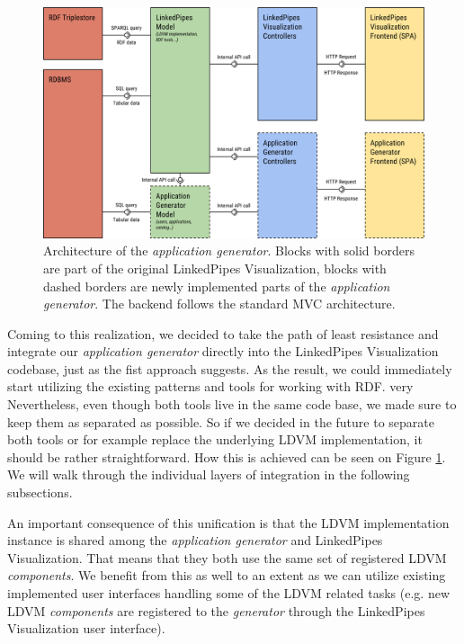 \begin{figure}
	\centering
	\includegraphics[width=140mm]{img/04_application_generator_architecture.png}
	\caption{Architecture of the \emph{application generator}. Blocks with solid borders are part of the original LinkedPipes Visualization, blocks with dashed borders are newly implemented parts of the \emph{application generator}. The backend follows the standard MVC architecture.} 
	\label{fig:proposed-application-generator-architecture}
\end{figure}

Coming to this realization, we decided to take the path of least resistance and integrate our \emph{application generator} directly into the LinkedPipes Visualization codebase, just as the fist approach suggests. As the result, we could immediately start utilizing the existing patterns and tools for working with RDF. 
very
Nevertheless, even though both tools live in the same code base, we made sure to keep them as separated as possible. So if we decided in the future to separate both tools or for example replace the underlying LDVM implementation, it should be rather straightforward. How this is achieved can be seen on Figure \ref{fig:proposed-application-generator-architecture}. We will walk through the individual layers of integration in the following subsections.

An important consequence of this unification is that the LDVM implementation instance is shared among the \emph{application generator} and LinkedPipes Visualization. That means that they both use the same set of registered LDVM \emph{components}. We benefit from this as well to an extent as we can utilize existing implemented user interfaces handling some of the LDVM related tasks (e.g. new LDVM \emph{components} are registered to the \emph{generator} through the LinkedPipes Visualization user interface).

